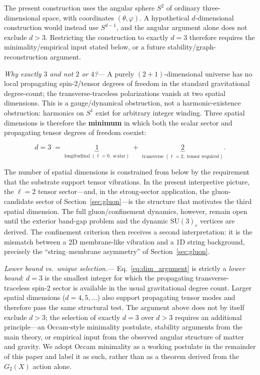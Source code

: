 \documentclass[11pt]{article}
\begin{document}
The present construction uses the angular sphere
$S^2$ of ordinary three-dimensional space, with
coordinates $(\theta,\varphi)$.  A hypothetical
$d$-dimensional construction would instead use
$S^{d-1}$, and the angular argument alone does
not exclude $d>3$.  Restricting the construction
to exactly $d=3$ therefore requires the
minimality/empirical input stated below, or a
future stability/graph-reconstruction argument.

\textit{Why exactly $3$ and not $2$ or $4$?}---
A purely $(2+1)$-dimensional universe has no
local propagating spin-2/tensor degrees of
freedom in the standard gravitational
degree-count; the transverse-traceless
polarizations vanish at two spatial dimensions.
This is a gauge/dynamical obstruction, not a
harmonic-existence obstruction: harmonics on
$S^1$ exist for arbitrary integer winding.
Three spatial dimensions is therefore the
\textbf{minimum} in which both the scalar sector
and propagating tensor degrees of freedom coexist:

\begin{equation}\label{eq:dim_argument}
  d = 3
  \;=\;
  \underbrace{1}_{\text{longitudinal}
    \;(\ell=0,\;\text{scalar})}
  \;+\;
  \underbrace{2}_{\text{transverse}
    \;(\ell=2,\;\text{tensor required})}.
\end{equation}

The number of spatial dimensions is constrained
from below by the requirement that the substrate
support tensor vibrations.  In the present
interpretive picture, the $\ell=2$ tensor
sector---and, in the strong-sector application,
the gluon-candidate sector of
Section~\ref{sec:gluon}---is the structure that
motivates the third spatial dimension.  The full
gluon/confinement dynamics, however, remain open
until the exterior band-gap problem and the
dynamic $\mathrm{SU}(3)_c$ vertices are derived.
The confinement criterion then receives a second
interpretation: it is the mismatch between a
2D membrane-like vibration and a 1D string
background, precisely the
``string--membrane asymmetry'' of
Section~\ref{sec:gluon}.

\textit{Lower bound vs.\ unique selection.}---%
Eq.~\eqref{eq:dim_argument} is strictly a
\emph{lower bound}: $d=3$ is the smallest
integer for which the propagating transverse-
traceless spin-2 sector is available in the
usual gravitational degree count.  Larger
spatial dimensions ($d=4, 5, \ldots$) also
support propagating tensor modes and therefore
pass the same structural test.  The argument above does not
by itself exclude $d>3$; the selection of
exactly $d=3$ over $d>3$ requires an
additional principle---an Occam-style
minimality postulate, stability arguments from
the main theory, or empirical input from the
observed angular structure of matter and
gravity.  We adopt Occam minimality as a
working postulate in the remainder of this
paper and label it as such, rather than as a
theorem derived from the $G_2(X)$ action alone.
\end{document}
